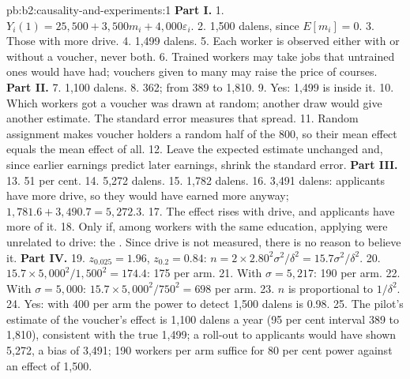 \begin{solution}{pb:b2:causality-and-experiments:1}
\textbf{Part I.}
1. $Y_i(1) = 25{,}500 + 3{,}500m_i + 4{,}000\varepsilon_i$.
2. 1,500 dalens, since $E[m_i] = 0$.
3. Those with more drive.
4. 1,499 dalens.
5. Each worker is observed either with or without a voucher, never both.
6. Trained workers may take jobs that untrained ones would have had; vouchers given to many may raise the price of
courses.
\textbf{Part II.}
7. 1,100 dalens.
8. 362; from 389 to 1,810.
9. Yes: 1,499 is inside it.
10. Which workers got a voucher was drawn at random; another draw would give another estimate. The standard error measures
that spread.
11. Random assignment makes voucher holders a random half of the 800, so their mean effect equals the mean effect of all.
12. Leave the expected estimate unchanged and, since earlier earnings predict later earnings, shrink the standard error.
\textbf{Part III.}
13. 51 per cent.
14. 5,272 dalens.
15. 1,782 dalens.
16. 3,491 dalens: applicants have more drive, so they would have earned more anyway; $1{,}781.6 + 3{,}490.7 = 5{,}272.3$.
17. The effect rises with drive, and applicants have more of it.
18. Only if, among workers with the same education, applying were unrelated to drive: the . Since drive is not measured, there is no reason to believe it.
\textbf{Part IV.}
19. $z_{0.025} = 1.96$, $z_{0.2} = 0.84$: $n = 2 \times 2.80^2\sigma^2/\delta^2 = 15.7\sigma^2/\delta^2$.
20. $15.7 \times 5{,}000^2/1{,}500^2 = 174.4$: 175 per arm.
21. With $\sigma = 5{,}217$: 190 per arm.
22. With $\sigma = 5{,}000$: $15.7 \times 5{,}000^2/750^2 = 698$ per arm.
23. $n$ is proportional to $1/\delta^2$.
24. Yes: with 400 per arm the power to detect 1,500 dalens is 0.98.
25. The pilot's estimate of the voucher's effect is 1,100 dalens a year (95 per cent interval 389 to 1,810), consistent with
the true 1,499; a roll-out to applicants would have shown 5,272, a bias of 3,491; 190 workers per arm suffice for 80 per
cent power against an effect of 1,500.
\end{solution}
